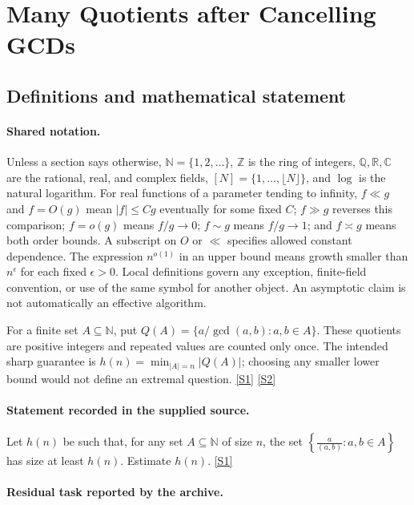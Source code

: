 \documentclass[11pt,a4paper]{article}
\newcommand{\N}{\mathbb{N}}
\newcommand{\Z}{\mathbb{Z}}
\newcommand{\Q}{\mathbb{Q}}
\newcommand{\R}{\mathbb{R}}
\newcommand{\C}{\mathbb{C}}
\newcommand{\sref}[2]{\hyperlink{source:#1:#2}{[S#2]}}
\begin{document}
\section{Many Quotients after Cancelling GCDs}\label{statement}


\subsection{Definitions and mathematical statement}

\paragraph{Shared notation.}Unless a section says otherwise, $\N=\{1,2,\ldots\}$,
$\Z$ is the ring of integers, $\Q,\R,\C$ are the rational, real, and complex
fields, $[N]=\{1,\ldots,\lfloor N\rfloor\}$, and $\log$ is the natural
logarithm. For real functions of a parameter tending to infinity,
$f\ll g$ and $f=O(g)$ mean $|f|\leq Cg$ eventually for some fixed $C$;
$f\gg g$ reverses this comparison; $f=o(g)$ means $f/g\to0$;
$f\sim g$ means $f/g\to1$; and $f\asymp g$ means both order bounds.
A subscript on $O$ or $\ll$ specifies allowed constant dependence.
The expression $n^{o(1)}$ in an upper bound means growth smaller than
$n^\epsilon$ for each fixed $\epsilon>0$. Local definitions govern any
exception, finite-field convention, or use of the same symbol for another
object. An asymptotic claim is not automatically an effective algorithm.



For a finite set $A\subseteq\N$, put $Q(A)=\{a/\gcd(a,b):a,b\in A\}$. These quotients are positive integers and repeated values are counted only once. The intended sharp guarantee is $h(n)=\min_{|A|=n}|Q(A)|$; choosing any smaller lower bound would not define an extremal question. \sref{statement}{1} \sref{statement}{2}

\paragraph{Statement recorded in the supplied source.}
Let $h(n)$ be such that, for any set $A\subseteq \mathbb{N}$ of size $n$, the set $ \left\{ \frac{a}{(a,b)}: a,b\in A\right\} $ has size at least $h(n)$. Estimate $h(n)$. \sref{statement}{1}

\paragraph{Residual task reported by the archive.}
\end{document}
